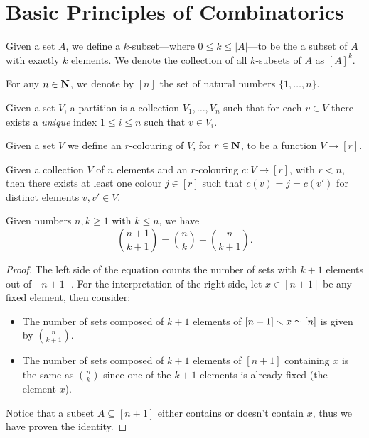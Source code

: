 \section{Basic Principles of Combinatorics}

\begin{notation}[\(k\)-subsets]
    Given a set \(A\), we define a \(k\)-subset---where \(0 \leq k \leq |A|\)---to
    be the a subset of \(A\) with exactly \(k\) elements. We denote the collection
    of all \(k\)-subsets of \(A\) as \([A]^k\).
\end{notation}

\begin{notation}[Range]
    For any \(n \in \mathbf{N}\), we denote by \([n]\) the set of natural numbers
    \(\{1, \dots, n\}\).
\end{notation}

\begin{definition}[Partition]
    Given a set \(V\), a partition is a collection \(V_1, \dots, V_n\) such
    that for each \(v \in V\) there exists a \emph{unique} index \(1 \leq i
    \leq n\) such that \(v \in V_i\).
\end{definition}

\begin{definition}[Colouring]
    Given a set \(V\) we define an \(r\)-colouring of \(V\), for \(r \in \mathbf{N}\),
    to be a function \(V \to [r]\).
\end{definition}

\begin{axiom}
    Given a collection \(V\) of \(n\) elements and an \(r\)-colouring \(c: V
    \to [r]\), with \(r < n\), then there exists at least one colour \(j \in
    [r]\) such that \(c(v) = j = c(v')\) for distinct elements \(v, v' \in V\).
\end{axiom}

\begin{lemma}
    Given numbers \(n, k \geq 1\) with \(k \leq n\), we have
    \[
        \binom{n + 1}{k+1} = \binom n k + \binom n {k + 1}.
    \]
\end{lemma}

\begin{proof}
    The left side of the equation counts the number of sets with \(k+1\)
    elements out of \([n+1]\). For the interpretation of the right side, let
    \(x \in [n + 1]\) be any fixed element, then consider:
    \begin{itemize}\setlength\itemsep{0em}
        \item The number of sets composed of \(k+1\) elements of \([n+1]
              \smallsetminus x \simeq [n]\) is given by
              \(\binom n {k+1}\).
        \item The number of sets composed of \(k+1\) elements of \([n+1]\)
              containing \(x\) is the same as \(\binom n k\) since one of the
              \(k+1\) elements is already fixed (the element \(x\)).
    \end{itemize}
    Notice that a subset \(A \subseteq [n + 1]\) either contains or doesn't
    contain \(x\), thus we have proven the identity.
\end{proof}

